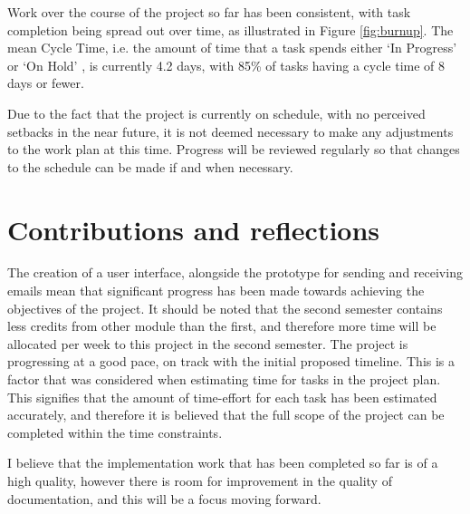 Work over the course of the project so far has been consistent, with task completion being spread out over time, as illustrated in Figure \ref{fig:burnup}. The mean Cycle Time, i.e. the amount of time that a task spends either `In Progress' or `On Hold' \cite{roock2010kanban}, is currently 4.2 days, with 85\% of tasks having a cycle time of 8 days or fewer.

Due to the fact that the project is currently on schedule, with no perceived setbacks in the near future, it is not deemed necessary to make any adjustments to the work plan at this time. Progress will be reviewed regularly so that changes to the schedule can be made if and when necessary.

\section{Contributions and reflections}

The creation of a user interface, alongside the prototype for sending and receiving emails mean that significant progress has been made towards achieving the objectives of the project. It should be noted that the second semester contains less credits from other module than the first, and therefore more time will be allocated per week to this project in the second semester. The project is progressing at a good pace, on track with the initial proposed timeline. This is a factor that was considered when estimating time for tasks in the project plan. This signifies that the amount of time-effort for each task has been estimated accurately, and therefore it is believed that the full scope of the project can be completed within the time constraints.

I believe that the implementation work that has been completed so far is of a high quality, however there is room for improvement in the quality of documentation, and this will be a focus moving forward.